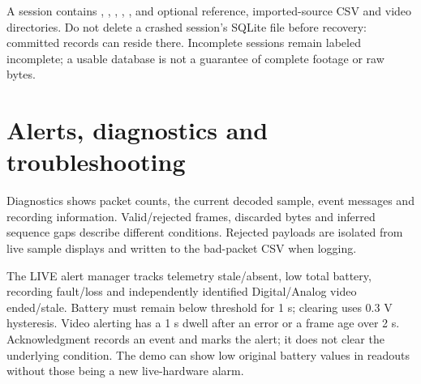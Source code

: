 A session contains , ,
, , , and optional
reference, imported-source CSV and video directories.
Do not delete a crashed session's SQLite  file before recovery:
committed records can reside there. Incomplete sessions remain labeled
incomplete; a usable database is not a guarantee of complete footage or raw bytes.

\section{Alerts, diagnostics and troubleshooting}
Diagnostics shows packet counts, the current decoded sample, event messages and
recording information. Valid/rejected frames, discarded bytes and inferred
sequence gaps describe different conditions. Rejected payloads are isolated
from live sample displays and written to the bad-packet CSV when logging.

The LIVE alert manager tracks telemetry stale/absent, low total battery,
recording fault/loss and independently identified Digital/Analog video ended/stale. Battery must remain below threshold
for 1 s; clearing uses 0.3 V hysteresis. Video alerting has a 1 s dwell after an
error or a frame age over 2 s. Acknowledgment records an event and marks the alert;
it does not clear the underlying condition. The demo can show low original
battery values in readouts without those being a new live-hardware alarm.

